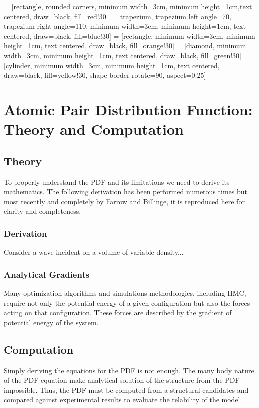  = [rectangle, rounded corners, minimum width=3cm, minimum height=1cm,text centered, draw=black, fill=red!30]
 = [trapezium, trapezium left angle=70, trapezium right angle=110, minimum width=3cm, minimum height=1cm, text centered, draw=black, fill=blue!30]
 = [rectangle, minimum width=3cm, minimum height=1cm, text centered, draw=black, fill=orange!30]
 = [diamond, minimum width=3cm, minimum height=1cm, text centered, draw=black, fill=green!30]
\usetikzlibrary{shapes.geometric}
 = [cylinder, minimum width=3cm, minimum height=1cm, text centered, draw=black, fill=yellow!30, shape border rotate=90, aspect=0.25]

\chapter{Atomic Pair Distribution Function: \\Theory and Computation}
\section{Theory}
To properly understand the PDF and its limitations we need to derive its mathematics.
The following derivation has been performed numerous times but most recently and completely by Farrow and Billinge, it is reproduced here for clarity and completeness.
\subsection{Derivation}
Consider a wave incident on a volume of variable density...
\subsection{Analytical Gradients}
Many optimization algorithms and simulations methodologies, including HMC, require not only the potential energy of a given configuration but also the forces acting on that configuration.
These forces are described by the gradient of potential energy of the system.

\section{Computation}
Simply deriving the equations for the PDF is not enough.
The many body nature of the PDF equation make analytical solution of the structure from the PDF impossible.
Thus, the PDF must be computed from a structural candidates and compared against experimental results to evaluate the relability of the model.


